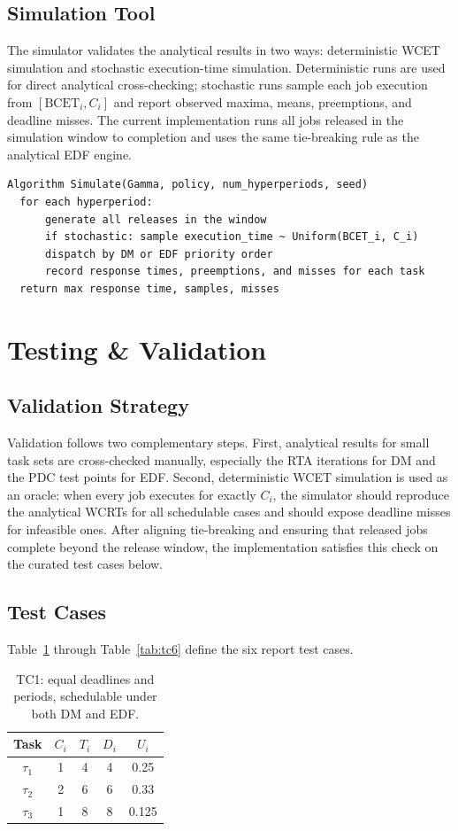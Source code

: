 \documentclass[11pt,a4paper]{article}
\begin{document}
\subsection{Simulation Tool}
The simulator validates the analytical results in two ways: deterministic WCET simulation and stochastic execution-time simulation. Deterministic runs are used for direct analytical cross-checking; stochastic runs sample each job execution from \([\mathrm{BCET}_i, C_i]\) and report observed maxima, means, preemptions, and deadline misses. The current implementation runs all jobs released in the simulation window to completion and uses the same tie-breaking rule as the analytical EDF engine.

\begin{verbatim}
Algorithm Simulate(Gamma, policy, num_hyperperiods, seed)
  for each hyperperiod:
      generate all releases in the window
      if stochastic: sample execution_time ~ Uniform(BCET_i, C_i)
      dispatch by DM or EDF priority order
      record response times, preemptions, and misses for each task
  return max response time, samples, misses
\end{verbatim}

\section{Testing \& Validation}

\subsection{Validation Strategy}
Validation follows two complementary steps. First, analytical results for small task sets are cross-checked manually, especially the RTA iterations for DM and the PDC test points for EDF. Second, deterministic WCET simulation is used as an oracle: when every job executes for exactly \(C_i\), the simulator should reproduce the analytical WCRTs for all schedulable cases and should expose deadline misses for infeasible ones. After aligning tie-breaking and ensuring that released jobs complete beyond the release window, the implementation satisfies this check on the curated test cases below.

\subsection{Test Cases}
Table~\ref{tab:tc1} through Table~\ref{tab:tc6} define the six report test cases.

\begin{table}[h]
\centering
\small
\begin{tabular}{|c|c|c|c|c|}
\hline
Task & \(C_i\) & \(T_i\) & \(D_i\) & \(U_i\) \\
\hline
\(\tau_1\) & 1 & 4 & 4 & 0.25 \\
\hline
\(\tau_2\) & 2 & 6 & 6 & 0.33 \\
\hline
\(\tau_3\) & 1 & 8 & 8 & 0.125 \\
\hline
\end{tabular}
\caption{TC1: equal deadlines and periods, schedulable under both DM and EDF.}
\label{tab:tc1}
\end{table}
\end{document}
